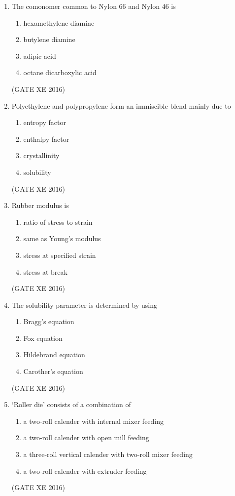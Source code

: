 \documentclass[12pt]{article}
\begin{document}
\begin{enumerate}
\item The comonomer common to Nylon 66 and Nylon 46 is
\begin{multicols}{2}
\begin{enumerate}
\item hexamethylene diamine 
\item butylene diamine 
\item adipic acid 
\item octane dicarboxylic acid 
\end{enumerate}
\end{multicols}
(GATE XE 2016)

\item Polyethylene and polypropylene form an immiscible blend mainly due to
\begin{multicols}{2}
\begin{enumerate}
\item entropy factor 
\item enthalpy factor 
\item crystallinity 
\item solubility 
\end{enumerate}
\end{multicols}
(GATE XE 2016)

\item Rubber modulus is
\begin{multicols}{2}
\begin{enumerate}
\item ratio of stress to strain 
\item same as Young's modulus 
\item stress at specified strain 
\item stress at break 
\end{enumerate}
\end{multicols}
(GATE XE 2016)

\item The solubility parameter is determined by using
\begin{multicols}{2}
\begin{enumerate}
\item Bragg's equation 
\item Fox equation 
\item Hildebrand equation 
\item Carother's equation 
\end{enumerate}
\end{multicols}
(GATE XE 2016)

\item ‘Roller die’ consists of a combination of
\begin{enumerate}
\item a two-roll calender with internal mixer feeding 
\item a two-roll calender with open mill feeding 
\item a three-roll vertical calender with two-roll mixer feeding 
\item a two-roll calender with extruder feeding 
\end{enumerate}
(GATE XE 2016)


\end{enumerate}
\end{document}
